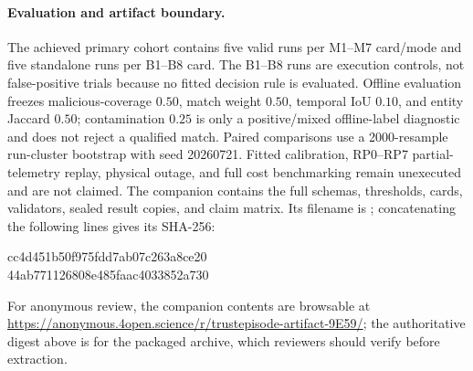 \paragraph{Evaluation and artifact boundary.}
The achieved primary cohort contains five valid runs per M1--M7 card/mode and five standalone
runs per B1--B8 card. The B1--B8 runs are execution controls, not false-positive trials because
no fitted decision rule is evaluated. Offline evaluation freezes malicious-coverage $0.50$, match
weight $0.50$, temporal IoU $0.10$, and entity Jaccard $0.50$; contamination $0.25$ is only a
positive/mixed offline-label diagnostic and does not reject a qualified match. Paired comparisons
use a 2000-resample run-cluster bootstrap with seed 20260721. Fitted calibration, RP0--RP7
partial-telemetry replay, physical
outage, and full cost benchmarking remain unexecuted and are not claimed. The companion contains
the full schemas, thresholds, cards, validators, sealed result copies, and claim matrix.
Its filename is ; concatenating the following
lines gives its SHA-256:
\begin{flushleft}\scriptsize\ttfamily
cc4d451b50f975fdd7ab07c263a8ce20\\
44ab771126808e485faac4033852a730
\end{flushleft}
For anonymous review, the companion contents are browsable at
\url{https://anonymous.4open.science/r/trustepisode-artifact-9E59/}; the authoritative digest above is
for the packaged archive, which reviewers should verify before extraction.

\endgroup
